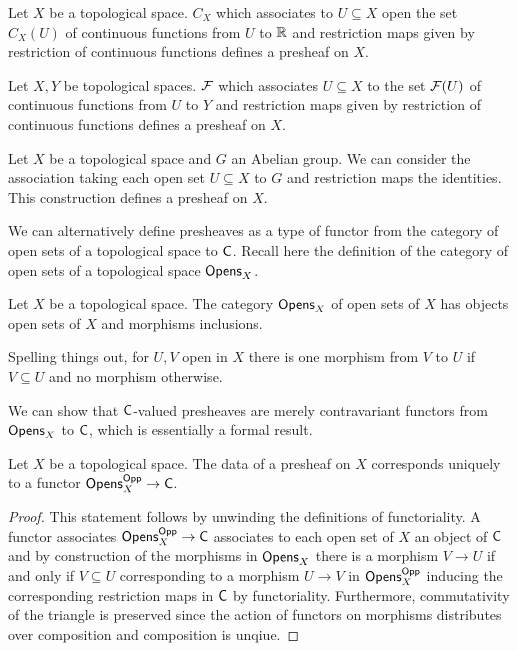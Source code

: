 \begin{example}\label{ex: presheaves of continuous functions}
    Let $X$ be a topological space. $C_{X}$ which associates to $U\subseteq X$ open the set $C_{X}(U)$ of continuous functions from $U$ to $\mathbb{R}$ and restriction maps given by restriction of continuous functions defines a presheaf on $X$. 
\end{example}
\begin{example}\label{ex: presheaves of continuous functions between topological spaces}
    Let $X,Y$ be topological spaces. $\mathcal{F}$ which associates $U\subseteq X$ to the set $\mathcal{F}(U)$ of continuous functions from $U$ to $Y$ and restriction maps given by restriction of continuous functions defines a presheaf on $X$.  
\end{example}
\begin{example}\label{ex: constant presheaves}
    Let $X$ be a topological space and $G$ an Abelian group. We can consider the association taking each open set $U\subseteq X$ to $G$ and restriction maps the identities. This construction defines a presheaf on $X$. 
\end{example}
We can alternatively define presheaves as a type of functor from the category of open sets of a topological space to $\mathsf{C}$. Recall here the definition of the category of open sets of a topological space $\mathsf{Opens}_{X}$.  
\begin{definition}\label{def: category of open sets}
    Let $X$ be a topological space. The category $\mathsf{Opens}_{X}$ of open sets of $X$ has objects open sets of $X$ and morphisms inclusions. 
\end{definition}
\begin{remark}
    Spelling things out, for $U,V$ open in $X$ there is one morphism from $V$ to $U$ if $V\subseteq U$ and no morphism otherwise. 
\end{remark}
We can show that $\mathsf{C}$-valued presheaves are merely contravariant functors from $\mathsf{Opens}_{X}$ to $\mathsf{C}$, which is essentially a formal result. 
\begin{proposition}\label{prop: presheaves are functors from open sets opposite}
    Let $X$ be a topological space. The data of a presheaf on $X$ corresponds uniquely to a functor $\mathsf{Opens}_{X}^{\mathsf{Opp}}\to\mathsf{C}$. 
\end{proposition}
\begin{proof}
    This statement follows by unwinding the definitions of functoriality. A functor associates $\mathsf{Opens}_{X}^{\mathsf{Opp}}\to\mathsf{C}$ associates to each open set of $X$ an object of $\mathsf{C}$ and by construction of the morphisms in $\mathsf{Opens}_{X}$ there is a morphism $V\to U$ if and only if $V\subseteq U$ corresponding to a morphism $U\to V$ in $\mathsf{Opens}_{X}^{\mathsf{Opp}}$ inducing the corresponding restriction maps in $\mathsf{C}$ by functoriality. Furthermore, commutativity of the triangle is preserved since the action of functors on morphisms distributes over composition and composition is unqiue.  
\end{proof}
